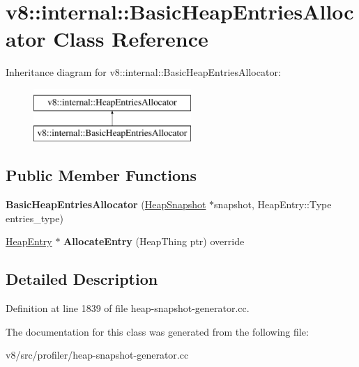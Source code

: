 \hypertarget{classv8_1_1internal_1_1BasicHeapEntriesAllocator}{}\section{v8\+:\+:internal\+:\+:Basic\+Heap\+Entries\+Allocator Class Reference}
\label{classv8_1_1internal_1_1BasicHeapEntriesAllocator}
Inheritance diagram for v8\+:\+:internal\+:\+:Basic\+Heap\+Entries\+Allocator\+:\begin{figure}[H]
\begin{center}
\leavevmode
\includegraphics[height=2.000000cm]{classv8_1_1internal_1_1BasicHeapEntriesAllocator}
\end{center}
\end{figure}
\subsection*{Public Member Functions}
\begin{DoxyCompactItemize}
\item 
\mbox{\label{classv8_1_1internal_1_1BasicHeapEntriesAllocator_a7a9fdb15588f5afce77f8794367f57ba}} 
{\bfseries Basic\+Heap\+Entries\+Allocator} (\mbox{\hyperlink{classv8_1_1internal_1_1HeapSnapshot}{Heap\+Snapshot}} $\ast$snapshot, Heap\+Entry\+::\+Type entries\+\_\+type)
\item 
\mbox{\label{classv8_1_1internal_1_1BasicHeapEntriesAllocator_af9aacfefa2164cac2e69d47147ea4867}} 
\mbox{\hyperlink{classv8_1_1internal_1_1HeapEntry}{Heap\+Entry}} $\ast$ {\bfseries Allocate\+Entry} (Heap\+Thing ptr) override
\end{DoxyCompactItemize}


\subsection{Detailed Description}


Definition at line 1839 of file heap-\/snapshot-\/generator.\+cc.



The documentation for this class was generated from the following file\+:\begin{DoxyCompactItemize}
\item 
v8/src/profiler/heap-\/snapshot-\/generator.\+cc\end{DoxyCompactItemize}
